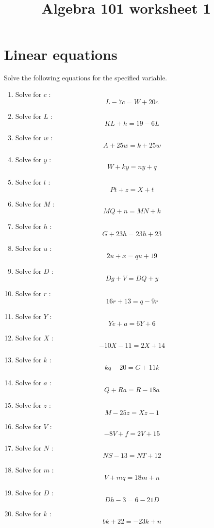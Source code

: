 \documentclass{article}
\begin{document}
    \title{Algebra 101 worksheet 1}
    
    \date{\vspace{-5ex}}  
    
    \maketitle

        \section{Linear equations}
        Solve the following equations for the specified variable.
        \begin{multicols}{1}
        \begin{enumerate}
        \item Solve for $c$ : $$L - 7 c = W + 20 c$$
\item Solve for $L$ : $$K L + h = 19 - 6 L$$
\item Solve for $w$ : $$A + 25 w = k + 25 w$$
\item Solve for $y$ : $$W + k y = n y + q$$
\item Solve for $t$ : $$P t + z = X + t$$
\item Solve for $M$ : $$M Q + n = M N + k$$
\item Solve for $h$ : $$G + 23 h = 23 h + 23$$
\item Solve for $u$ : $$2 u + x = q u + 19$$
\item Solve for $D$ : $$D g + V = D Q + y$$
\item Solve for $r$ : $$16 r + 13 = q - 9 r$$
\item Solve for $Y$ : $$Y e + a = 6 Y + 6$$
\item Solve for $X$ : $$- 10 X - 11 = 2 X + 14$$
\item Solve for $k$ : $$k q - 20 = G + 11 k$$
\item Solve for $a$ : $$Q + R a = R - 18 a$$
\item Solve for $z$ : $$M - 25 z = X z - 1$$
\item Solve for $V$ : $$- 8 V + f = 2 V + 15$$
\item Solve for $N$ : $$N S - 13 = N T + 12$$
\item Solve for $m$ : $$V + m q = 18 m + n$$
\item Solve for $D$ : $$D h - 3 = 6 - 21 D$$
\item Solve for $k$ : $$b k + 22 = - 23 k + n$$
        \end{enumerate}
        \end{multicols}
        
\end{document}
